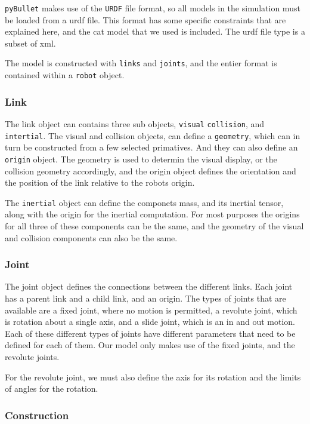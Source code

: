\documentclass[12]{amsart}
\theoremstyle{definition}
\begin{document}
\texttt{pyBullet} makes use of the \texttt{URDF} file format, so all models in
the simulation must be loaded from a urdf file. This format has some specific
constraints that are explained here, and the cat model that we used is
included. The urdf file type is a subset of xml.

The model is constructed with \texttt{links} and \texttt{joints}, and the
entier format is contained within a \texttt{robot} object.

\subsubsection{Link}%
\label{ssub:Link}

The link object can contains three sub objects, \texttt{visual}
\texttt{collision}, and \texttt{intertial}. The visual and collision objects,
can define a \texttt{geometry}, which can in turn be constructed from a few
selected primatives. And they can also define an \texttt{origin} object. The
geometry is used to determin the visual display, or the collision geometry
accordingly, and the origin object defines the orientation and the position of
the link relative to the robots origin.

The \texttt{inertial} object can define the componets mass, and its inertial
tensor, along with the origin for the inertial computation. For most purposes
the origins for all three of these components can be the same, and the geometry
of the visual and collision components can also be the same.

\subsubsection{Joint}%
\label{ssub:joint}

The joint object defines the connections between the different links. Each
joint has a parent link and a child link, and an origin. The types of joints
that are available are a fixed joint, where no motion is permitted, a revolute
joint, which is rotation about a single axis, and a slide joint, which is an in
and out motion. Each of these different types of joints have different
parameters that need to be defined for each of them. Our model only makes use
of the fixed joints, and the revolute joints.

For the revolute joint, we must also define the axis for its rotation and the
limits of angles for the rotation.

\subsubsection{Construction}%
\label{ssub:construction}
\end{document}
